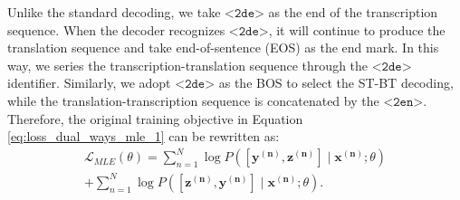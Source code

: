 \documentclass[letterpaper]{article} %
\begin{document}
Unlike the standard decoding, we take $\texttt{<2de>}$ as the end of the transcription sequence.
When the decoder recognizes $\texttt{<2de>}$, it will continue to produce the translation sequence and take end-of-sentence (EOS) as the end mark.
In this way, we series the transcription-translation sequence through the $\texttt{<2de>}$ identifier.
Similarly, we adopt $\texttt{<2de>}$ as the BOS to select the ST-BT decoding, while the translation-transcription sequence is concatenated by the $\texttt{<2en>}$.
Therefore, the original training objective in Equation \ref{eq:loss_dual_ways_mle_1} can be rewritten as:
\begin{equation}
    \begin{aligned}
    \mathcal{L}_{MLE}(\theta) = \sum_{n=1}^{N} \log P\left([\mathbf{y^{(n)}}, \mathbf{z^{(n)}}] \mid \mathbf{x^{(n)}} ; \theta\right)  \\
     + \sum_{n=1}^{N} \log P\left([\mathbf{z^{(n)}}, \mathbf{y^{(n)}}] \mid \mathbf{x^{(n)}} ; \theta\right).
    \end{aligned}
    \label{eq:loss_dual_ways_mle}
\end{equation}
\end{document}
